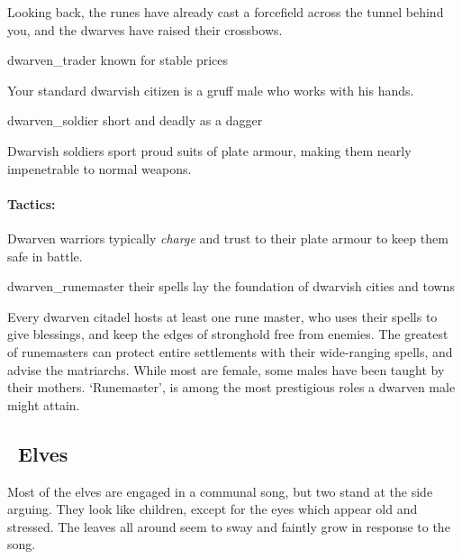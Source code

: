 \begin{multicols}{2}
\begin{boxtext}
  Looking back, the runes have already cast a forcefield across the tunnel behind you, and the dwarves have raised their crossbows.

\end{boxtext}

  {dwarven_trader}%
  {known for stable prices}%


Your standard dwarvish citizen is a gruff male who works with his hands.

\dwarventrader

  {dwarven_soldier}%
  {short and deadly as a dagger}%

Dwarvish soldiers sport proud suits of plate armour, making them nearly impenetrable to normal weapons.


\paragraph{Tactics:} Dwarven  warriors typically \textit{charge} and trust to their plate armour to keep them safe in battle.%


  {dwarven_runemaster}%
  {their spells lay the foundation of dwarvish cities and towns}%

Every dwarven citadel hosts at least one rune master, who uses their spells to give blessings, and keep the edges of stronghold free from enemies.
The greatest of runemasters can protect entire settlements with their wide-ranging spells, and advise the matriarchs.
While most are female, some males have been taught by their mothers.
`Runemaster', is among the most prestigious roles a dwarven male might attain.

\dwarvenrunemaster

\subsection[Elves]{\El\ Elves}
\label{best_elves}

\begin{boxtext}

  Most of the elves are engaged in a communal song, but two stand at the side arguing.
  They look like children, except for the eyes which appear old and stressed.
  The leaves all around seem to sway and faintly grow in response to the song.


\end{boxtext}
\end{multicols}
